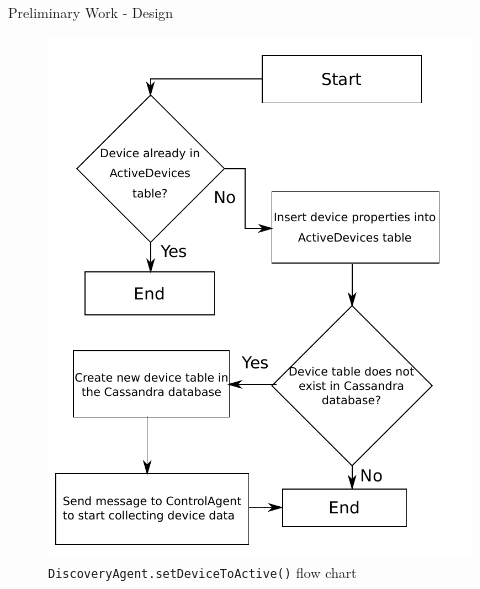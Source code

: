 \documentclass{beamer}
\begin{document}
\begin{frame}{Preliminary Work - Design}{}
    \begin{figure}
        \centering
        \includegraphics[scale=0.35]{figs/setDeviceToActiveFlow.pdf}
        \caption{\texttt{DiscoveryAgent.setDeviceToActive()} flow chart}
        \label{fig:setDeviceToActiveFlow}
    \end{figure}
\end{frame}
\end{document}
